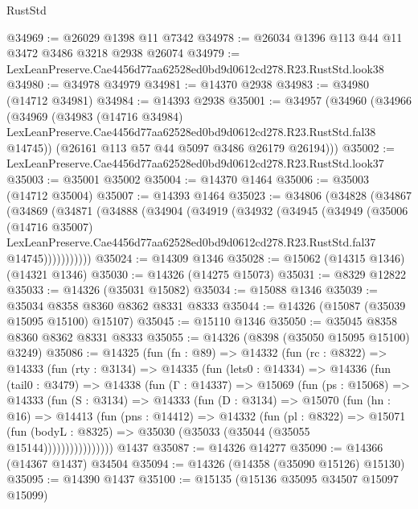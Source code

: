 \begin{lexlean}{RustStd}
\begin{coremodule}
@34969 := @26029 @1398 @11 @7342
@34978 := @26034 @1396 @113 @44 @11 @3472 @3486 @3218 @2938 @26074
@34979 := LexLeanPreserve.Cae4456d77aa62528ed0bd9d0612cd278.R23.RustStd.look38
@34980 := @34978 @34979
@34981 := @14370 @2938
@34983 := @34980 (@14712 @34981)
@34984 := @14393 @2938
@35001 := @34957
    (@34960
      (@34966
        (@34969
          (@34983
            (@14716 @34984)
            LexLeanPreserve.Cae4456d77aa62528ed0bd9d0612cd278.R23.RustStd.fal38
            @14745))
        (@26161 @113 @57 @44 @5097 @3486 @26179 @26194)))
@35002 := LexLeanPreserve.Cae4456d77aa62528ed0bd9d0612cd278.R23.RustStd.look37
@35003 := @35001 @35002
@35004 := @14370 @1464
@35006 := @35003 (@14712 @35004)
@35007 := @14393 @1464
@35023 := @34806
    (@34828
      (@34867
        (@34869
          (@34871
            (@34888
              (@34904
                (@34919
                  (@34932
                    (@34945
                      (@34949
                        (@35006
                          (@14716 @35007)
                          LexLeanPreserve.Cae4456d77aa62528ed0bd9d0612cd278.R23.RustStd.fal37
                          @14745)))))))))))
@35024 := @14309 @1346
@35028 := @15062 (@14315 @1346) (@14321 @1346)
@35030 := @14326 (@14275 @15073)
@35031 := @8329 @12822
@35033 := @14326 (@35031 @15082)
@35034 := @15088 @1346
@35039 := @35034 @8358 @8360 @8362 @8331 @8333
@35044 := @14326 (@15087 (@35039 @15095 @15100) @15107)
@35045 := @15110 @1346
@35050 := @35045 @8358 @8360 @8362 @8331 @8333
@35055 := @14326 (@8398 (@35050 @15095 @15100) @3249)
@35086 := @14325
    (fun (fn : @89) =>
    @14332
      (fun (rc : @8322) =>
      @14333
        (fun (rty : @3134) =>
        @14335
          (fun (lets0 : @14334) =>
          @14336
            (fun (tail0 : @3479) =>
            @14338
              (fun (Γ : @14337) =>
              @15069
                (fun (ps : @15068) =>
                @14333
                  (fun (S : @3134) =>
                  @14333
                    (fun (D : @3134) =>
                    @15070
                      (fun (hn : @16) =>
                      @14413
                        (fun (pns : @14412) =>
                        @14332
                          (fun (pl : @8322) =>
                          @15071
                            (fun (bodyL : @8325) =>
                            @35030 (@35033 (@35044 (@35055 @15144))))))))))))))))
    @1437
@35087 := @14326 @14277
@35090 := @14366 (@14367 @1437) @34504
@35094 := @14326 (@14358 (@35090 @15126) @15130)
@35095 := @14390 @1437
@35100 := @15135 (@15136 @35095 @34507 @15097 @15099)

\end{coremodule}
\end{lexlean}
